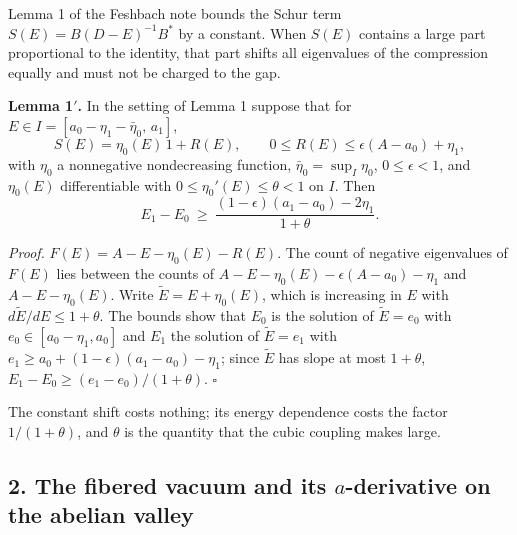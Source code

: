 \documentclass[11pt,a4paper]{article}
\begin{document}
Lemma 1 of the Feshbach note bounds the Schur term
\(S(E)=B(D-E)^{-1}B^*\) by a constant. When \(S(E)\) contains a large
part proportional to the identity, that part shifts all eigenvalues of
the compression equally and must not be charged to the gap.

\textbf{Lemma 1\('\).} In the setting of Lemma 1 suppose that for
\(E\in I=[a_0-\eta_1-\bar\eta_0,\,a_1]\),
\[S(E)=\eta_0(E)\,1+R(E),\qquad 0\le R(E)\le\epsilon(A-a_0)+\eta_1,\]
with \(\eta_0\) a nonnegative nondecreasing function,
\(\bar\eta_0=\sup_I\eta_0\), \(0\le\epsilon<1\), and \(\eta_0(E)\)
differentiable with \(0\le\eta_0'(E)\le\theta<1\) on \(I\). Then
\[E_1-E_0\ \ge\ \frac{(1-\epsilon)(a_1-a_0)-2\eta_1}{1+\theta}.\]

\emph{Proof.} \(F(E)=A-E-\eta_0(E)-R(E)\). The count of negative
eigenvalues of \(F(E)\) lies between the counts of
\(A-E-\eta_0(E)-\epsilon(A-a_0)-\eta_1\) and \(A-E-\eta_0(E)\). Write
\(\tilde E=E+\eta_0(E)\), which is increasing in \(E\) with
\(d\tilde E/dE\le1+\theta\). The bounds show that \(E_0\) is the
solution of \(\tilde E=e_0\) with \(e_0\in[a_0-\eta_1,a_0]\) and \(E_1\)
the solution of \(\tilde E=e_1\) with
\(e_1\ge a_0+(1-\epsilon)(a_1-a_0)-\eta_1\); since \(\tilde E\) has
slope at most \(1+\theta\), \(E_1-E_0\ge(e_1-e_0)/(1+\theta)\).
\(\square\)

The constant shift costs nothing; its energy dependence costs the factor
\(1/(1+\theta)\), and \(\theta\) is the quantity that the cubic coupling
makes large.

\hypertarget{the-fibered-vacuum-and-its-a-derivative-on-the-abelian-valley}{%
\subsection{\texorpdfstring{2. The fibered vacuum and its
\(a\)-derivative on the abelian
valley}{2. The fibered vacuum and its a-derivative on the abelian valley}}\label{the-fibered-vacuum-and-its-a-derivative-on-the-abelian-valley}}
\end{document}
